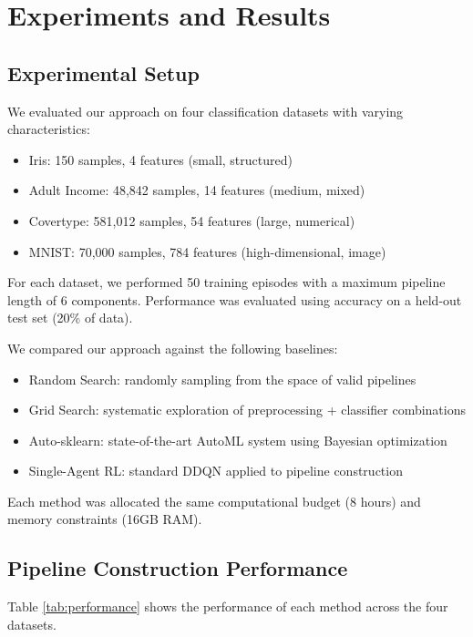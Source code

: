 \documentclass[twoside,11pt]{article}
\begin{document}
\section{Experiments and Results}

\subsection{Experimental Setup}

We evaluated our approach on four classification datasets with varying characteristics:

\begin{itemize}
    \item Iris: 150 samples, 4 features (small, structured)
    \item Adult Income: 48,842 samples, 14 features (medium, mixed)
    \item Covertype: 581,012 samples, 54 features (large, numerical)
    \item MNIST: 70,000 samples, 784 features (high-dimensional, image)
\end{itemize}

For each dataset, we performed 50 training episodes with a maximum pipeline length of 6 components. Performance was evaluated using accuracy on a held-out test set (20\% of data).

We compared our approach against the following baselines:
\begin{itemize}
    \item Random Search: randomly sampling from the space of valid pipelines
    \item Grid Search: systematic exploration of preprocessing + classifier combinations
    \item Auto-sklearn: state-of-the-art AutoML system using Bayesian optimization
    \item Single-Agent RL: standard DDQN applied to pipeline construction
\end{itemize}

Each method was allocated the same computational budget (8 hours) and memory constraints (16GB RAM).

\subsection{Pipeline Construction Performance}

Table \ref{tab:performance} shows the performance of each method across the four datasets.
\end{document}
